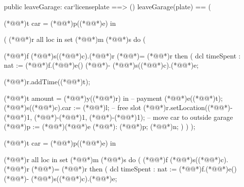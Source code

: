 \documentclass[a4paper]{article}
\begin{document}
\begin{vdm_al}
public leaveGarage: car`licenseplate ==> ()
leaveGarage(plate) ==
(
       
        (*@@*)t car = (*@@*)p((*@@*)e) in
        
        (
            (*@@*)r all loc in set (*@@*)m (*@@*)s do
            (   
                
                (*@@*)f (*@@*)s((*@@*)c).(*@@*)r (*@\vdmnotcovered{}@*)= (*@@*)r then
                (   
                    dcl timeSpent : nat := (*@@*)f.(*@@*)e() (*@\vdmnotcovered{}@*)- (*@@*)s((*@@*)c).(*@@*)e;
         
                    (*@@*)r.addTime((*@@*)t);
                    
                    (*@@*)t amount = (*@@*)y((*@@*)r) in  -- payment
                    (*@@*)e((*@@*)t);
                    (*@@*)s((*@@*)c).car := (*@@*)l;  -- free slot
                    (*@@*)r.setLocation((*@\vdmnotcovered{}@*)-(*@\vdmnotcovered{}@*)1, (*@\vdmnotcovered{}@*)-(*@\vdmnotcovered{}@*)1, (*@\vdmnotcovered{}@*)-(*@\vdmnotcovered{}@*)1);  -- move car to outside garage
                    (*@@*)p := (*@\vdmnotcovered{}@*){(*@@*)e} (*@\vdmnotcovered{<-}@*): (*@@*)p;
                   (*@@*)n;
                )
            )
        );
        
        (*@@*)t car = (*@@*)p((*@@*)e) in

            (*@@*)r all loc in set (*@@*)m (*@@*)s do
            (
                (*@@*)f (*@@*)s((*@@*)c).(*@@*)r (*@\vdmnotcovered{}@*)= (*@@*)r then
                (
                    dcl timeSpent : nat := (*@@*)f.(*@@*)e() (*@\vdmnotcovered{}@*)- (*@@*)s((*@@*)c).(*@@*)e;
         

\end{vdm_al}
\end{document}
